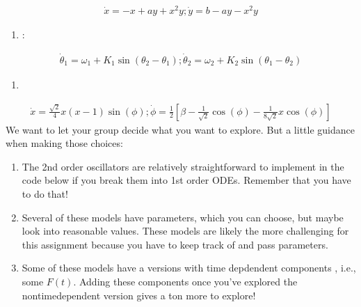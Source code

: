 \documentclass[letterpaper,10pt,english]{jupyterBook}
\begin{document}
\begin{equation*}
\begin{split}\dot{x} = -x + ay + x^2 y ; \dot{y} = b - ay - x^2y\end{split}
\end{equation*}\begin{enumerate}
%
\item {} 
\sphinxAtStartPar
{}:

\end{enumerate}
\begin{equation*}
\begin{split}\dot{\theta}_1 = \omega_1 + K_1 \sin(\theta_2 - \theta_1) ; \dot{\theta}_2 = \omega_2 + K_2\sin(\theta_1 - \theta_2) \end{split}
\end{equation*}\begin{enumerate}
%
\item {} 
\sphinxAtStartPar
{}

\end{enumerate}
\begin{equation*}
\begin{split}\dot{x} = \frac{\sqrt{2}}{4}x (x-1)\sin(\phi); \dot{\phi} = \frac{1}{2}\left[\beta - \frac{1}{\sqrt 2}\cos(\phi) - \frac{1}{8\sqrt{2}}x\cos(\phi)\right]\end{split}
\end{equation*}
\sphinxAtStartPar
We want to let your group decide what you want to explore. But a little guidance when making those choices:
\begin{enumerate}
%
\item {} 
\sphinxAtStartPar
The 2nd order oscillators are relatively straightforward to implement in the code below if you break them into 1st order ODEs. Remember that you have to do that!

\item {} 
\sphinxAtStartPar
Several of these models have parameters, which you can choose, but maybe look into reasonable values. These models are likely the more challenging for this assignment because you have to keep track of and pass parameters.

\item {} 
\sphinxAtStartPar
Some of these models have a versions with time depdendent components , i.e., some \(F(t)\). Adding these components once you’ve explored the non\sphinxhyphen{}time\sphinxhyphen{}dependent version gives a ton more to explore!

\end{enumerate}
\end{document}
